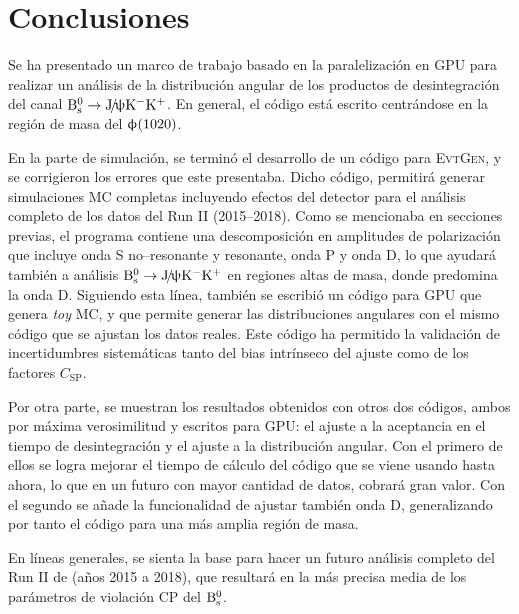 \chapter{Conclusiones}


Se ha presentado un marco de trabajo basado en la paralelización en GPU para realizar un análisis de la distribución angular de los productos de desintegración del canal $\text{B}{}_{\text{s}}^{0} \rightarrow \text{J}\!/\!\uppsi \text{K}{}^{-} \text{K}{}^{+}$. En general, el código está escrito centrándose en la región de masa del $\upphi(1020)$. 

En la parte de simulación, se terminó el desarrollo de un código para \textsc{EvtGen}, y se corrigieron los errores que este presentaba. Dicho código, permitirá generar simulaciones MC completas incluyendo efectos del detector para el análisis completo de los datos del Run II (2015--2018). Como se mencionaba en secciones previas, el programa contiene una descomposición en amplitudes de polarización que incluye onda S no--resonante y resonante, onda P y onda D, lo que ayudará también a análisis $\text{B}{}_{\text{s}}^{0} \rightarrow \text{J}\!/\!\uppsi \text{K}{}^{-} \text{K}{}^{+}$ en regiones altas de masa, donde predomina la onda D.
Siguiendo esta línea, también se escribió un código para GPU que genera \emph{toy} MC, y que permite generar las distribuciones angulares con el mismo código que se ajustan los datos reales. Este código ha permitido la validación de incertidumbres sistemáticas tanto del bias intrínseco del ajuste como de los factores $C_{\text{SP}}$.

Por otra parte, se muestran los resultados obtenidos con otros dos códigos, ambos por máxima verosimilitud y escritos para GPU: el ajuste a la aceptancia en el tiempo de desintegración y el ajuste a la distribución angular. Con el primero de ellos se logra mejorar el tiempo de cálculo del código que se viene usando hasta ahora, lo que en un futuro con mayor cantidad de datos, cobrará gran valor. Con el segundo se añade la funcionalidad de ajustar también onda D, generalizando por tanto el código para una más amplia región de masa.

 
En líneas generales, se sienta la base para hacer un futuro análisis completo del Run II de \lhcb (años 2015 a 2018), que resultará en la más precisa media de los parámetros de violación CP del $\text{B}{}_{\text{s}}^{0}$.